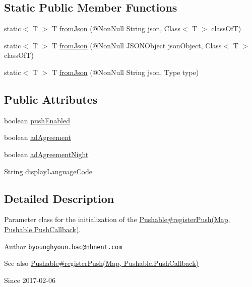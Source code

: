 \subsection*{Static Public Member Functions}
\begin{DoxyCompactItemize}
\item 
static$<$ T $>$ T \hyperlink{classcom_1_1toast_1_1android_1_1gamebase_1_1base_1_1_value_object_ae6655c88c20a9a8406dc11b46250ac7b}{from\+Json} (@Non\+Null String json, Class$<$ T $>$ class\+OfT)
\item 
static$<$ T $>$ T \hyperlink{classcom_1_1toast_1_1android_1_1gamebase_1_1base_1_1_value_object_ab83c4196ee2e3f11553bbe0f04dc2101}{from\+Json} (@Non\+Null J\+S\+O\+N\+Object json\+Object, Class$<$ T $>$ class\+OfT)
\item 
static$<$ T $>$ T \hyperlink{classcom_1_1toast_1_1android_1_1gamebase_1_1base_1_1_value_object_aa901d97d495150b54bcb80c05672f58a}{from\+Json} (@Non\+Null String json, Type type)
\end{DoxyCompactItemize}
\subsection*{Public Attributes}
\begin{DoxyCompactItemize}
\item 
boolean \hyperlink{classcom_1_1toast_1_1android_1_1gamebase_1_1base_1_1push_1_1_push_configuration_a6cb5840fefbcd01e810f92e3a270e373}{push\+Enabled}
\item 
boolean \hyperlink{classcom_1_1toast_1_1android_1_1gamebase_1_1base_1_1push_1_1_push_configuration_a47f216175d1e29d238388ed44cd36b5e}{ad\+Agreement}
\item 
boolean \hyperlink{classcom_1_1toast_1_1android_1_1gamebase_1_1base_1_1push_1_1_push_configuration_a00e836027263a722a6bbc61dda11335d}{ad\+Agreement\+Night}
\item 
String \hyperlink{classcom_1_1toast_1_1android_1_1gamebase_1_1base_1_1push_1_1_push_configuration_a4275e397239a0159905fcc9673788246}{display\+Language\+Code}
\end{DoxyCompactItemize}


\subsection{Detailed Description}
Parameter class for the initialization of the \hyperlink{}{Pushable\#register\+Push(\+Map, Pushable.\+Push\+Callback)}. 

\begin{DoxyAuthor}{Author}
\href{mailto:byounghyoun.bac@nhnent.com}{\tt byounghyoun.\+bac@nhnent.\+com} 
\end{DoxyAuthor}
\begin{DoxySeeAlso}{See also}
\hyperlink{}{Pushable\#register\+Push(\+Map, Pushable.\+Push\+Callback)} 
\end{DoxySeeAlso}
\begin{DoxySince}{Since}
2017-\/02-\/06 
\end{DoxySince}


